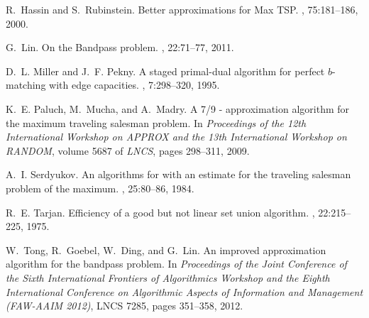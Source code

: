 \documentclass[11pt,twoside]{article}\usepackage{amssymb,latexsym,graphicx,hyperref}\usepackage{epstopdf}
\begin{document}
\begin{thebibliography}{10}
R.~Hassin and S.~Rubinstein.
\newblock Better approximations for {Max} {TSP}.
, 75:181--186, 2000.

G.~Lin.
\newblock On the {Bandpass} problem.
, 22:71--77, 2011.

D.~L. Miller and J.~F. Pekny.
\newblock A staged primal-dual algorithm for perfect $b$-matching with edge
  capacities.
, 7:298--320, 1995.

K.~E. Paluch, M.~Mucha, and A.~Madry.
\newblock A 7/9 - approximation algorithm for the maximum traveling salesman
  problem.
\newblock In {\em Proceedings of the 12th International Workshop on APPROX and
  the 13th International Workshop on RANDOM}, volume 5687 of {\em LNCS}, pages
  298--311, 2009.

A.~I. Serdyukov.
\newblock An algorithms for with an estimate for the traveling salesman problem
  of the maximum.
, 25:80--86, 1984.

R.~E. Tarjan.
\newblock Efficiency of a good but not linear set union algorithm.
, 22:215--225, 1975.

W.~Tong, R.~Goebel, W.~Ding, and G.~Lin.
\newblock An improved approximation algorithm for the bandpass problem.
\newblock In {\em Proceedings of the Joint Conference of the Sixth
  International Frontiers of Algorithmics Workshop and the Eighth International
  Conference on Algorithmic Aspects of Information and Management (FAW-AAIM
  2012)}, LNCS 7285, pages 351--358, 2012.

\end{thebibliography}
\end{document}
